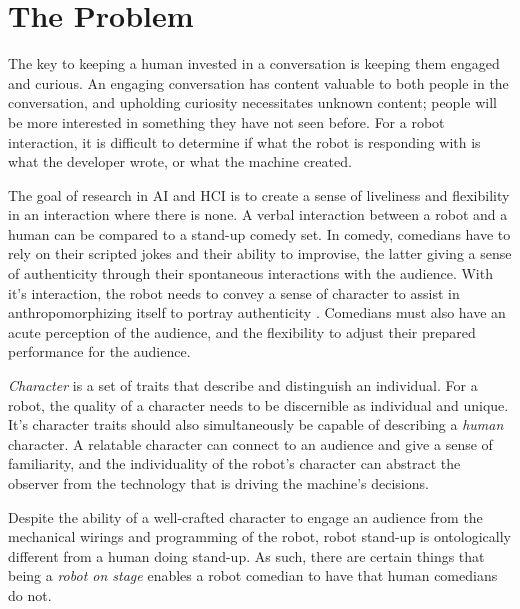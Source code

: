 \documentclass[onecolumn, draftclsnofoot,10pt, compsoc]{IEEEtran}
\begin{document}
\newpage
{}
\tableofcontents
\clearpage

\section{The Problem}






The key to keeping a human invested in a conversation is keeping them engaged and curious. An engaging conversation has content valuable to both people in the conversation, and upholding curiosity necessitates unknown content; people will be more interested in something they have not seen before. For a robot interaction, it is difficult to determine if what the robot is responding with is what the developer wrote, or what the machine created. 

The goal of research in AI and HCI is to create a sense of liveliness and flexibility in an interaction where there is none. 
A verbal interaction between a robot and a human can be compared to a stand-up comedy set. In comedy, comedians have to rely on their scripted jokes and their ability to improvise, the latter giving a sense of authenticity through their spontaneous interactions with the audience. With it’s interaction, the robot needs to convey a sense of character to assist in anthropomorphizing itself to portray authenticity . Comedians must also have an acute perception of the audience, and the flexibility to adjust their prepared performance for the audience. 

{\it{Character}} is a set of traits that describe and distinguish an individual. For a robot, the quality of a character needs to be discernible as individual and unique. It’s character traits should also simultaneously be capable of describing a {\it{human}} character.
A relatable character can connect to an audience and give a sense of familiarity, and the individuality of the robot's character can abstract the observer from the technology that is driving the machine’s decisions. 

Despite the ability of a well-crafted character to engage an audience from the mechanical wirings and programming of the robot, robot stand-up is ontologically different from a human doing stand-up. As such, there are certain things that being a {\it{robot on stage}} enables a robot comedian to have that human comedians do not. 
\end{document}
